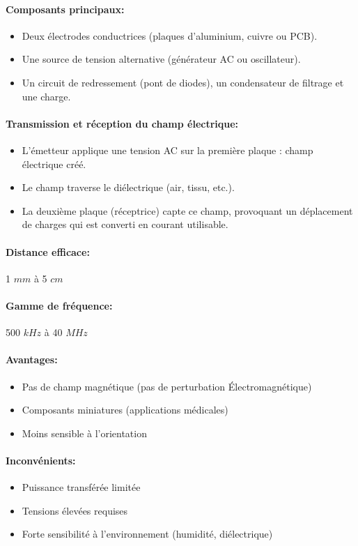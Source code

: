 \documentclass[12pt,a4paper,titlepage,notitlepage]{article}
\begin{document}
	\paragraph{Composants principaux: }
	\begin{itemize}
		\item Deux électrodes conductrices (plaques d’aluminium, cuivre ou PCB).
		\item Une source de tension alternative (générateur AC ou oscillateur).
		\item Un circuit de redressement (pont de diodes), un condensateur de filtrage et une charge.
	\end{itemize}
	\paragraph{Transmission et réception du champ électrique: }
	\begin{itemize}
		\item L’émetteur applique une tension AC sur la première plaque : champ électrique créé.
		\item Le champ traverse le diélectrique (air, tissu, etc.).
		\item La deuxième plaque (réceptrice) capte ce champ, provoquant un déplacement de charges qui est converti en courant utilisable.
	\end{itemize}
	\paragraph{Distance efficace: \\}
	1 $mm$ à 5 $cm$
	\paragraph{Gamme de fréquence: \\}
	500 $kHz$ à 40 $MHz$
	\paragraph{Avantages: }
	\begin{itemize}
		\item Pas de champ magnétique (pas de perturbation Électromagnétique)
		\item Composants miniatures (applications médicales)
		\item Moins sensible à l’orientation
	\end{itemize}
	\paragraph{Inconvénients: }
	\begin{itemize}
		\item Puissance transférée limitée
		\item Tensions élevées requises
		\item Forte sensibilité à l’environnement (humidité, diélectrique)
	\end{itemize}
\end{document}

